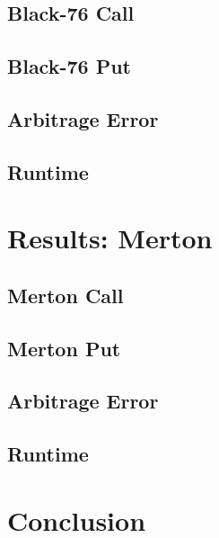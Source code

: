 \documentclass[12pt]{article}
\numberwithin{equation}{section}
\begin{document}
\subsection{Black-76 Call}
\subsection{Black-76 Put}
\subsection{Arbitrage Error}
\subsection{Runtime}

\section{Results: Merton}
\subsection{Merton Call}
\subsection{Merton Put}
\subsection{Arbitrage Error}
\subsection{Runtime}

\section{Conclusion}
\end{document}
